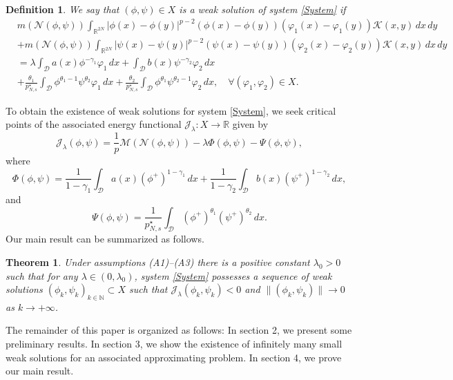 \documentclass[10pt,a4paper]{amsart}
\numberwithin{equation}{section}
\newtheorem{theorem}[theo]{Theorem}
\newtheorem{definition}[theo]{Definition}
\begin{document}
\begin{definition}\rm
We say that $(\phi,\psi)\in X$ is a weak solution of system \eqref{System} if
\begin{equation} \label{p11weak}
\begin{aligned}
&m(\mathcal{N}(\phi,\psi))\int_{\mathbb{R}^{2N}}|\phi(x)
 -\phi(y)|^{p-2}(\phi(x)-\phi(y))(\varphi_1(x)
 -\varphi_1(y))\mathcal{K}(x,y)\,dx\,dy \\
&+m(\mathcal{N}(\phi,\psi))\int_{\mathbb{R}^{2N}}|\psi(x)
-\psi(y)|^{p-2}(\psi(x)-\psi(y))(\varphi_2(x)-\varphi_2(y))\mathcal{K}(x,y)\,dx\,dy \\
&=\lambda \int_\mathcal{D} a(x)\phi^{-\gamma_1}\varphi_1\,dx+ \int_\mathcal{D}b(x)
 \psi^{-\gamma_2}\varphi_2\,dx \\
&+\frac{\theta_1}{p^\star_{N,s}}\int_\mathcal{D}\phi^{\theta_1-1}
\psi^{\theta_2}\varphi_1\,dx
+\frac{\theta_2}{p^\star_{N,s}}\int_\mathcal{D}\phi^{\theta_1}\psi^{\theta_2-1}
\varphi_2\,dx,\quad \forall (\varphi_1,\varphi_2)\in X.
\end{aligned}
\end{equation}
\end{definition}

To obtain the existence of  weak solutions for system \eqref{System}, 
we seek critical points of the associated energy functional 
$\mathcal{J}_\lambda:X\to\mathbb{R}$ given by
$$
\mathcal{J}_\lambda(\phi,\psi)=\frac{1}{p}\mathscr{M}(\mathcal{N}(\phi,\psi))
-\lambda \Phi(\phi,\psi)-\Psi(\phi,\psi), 
$$
where
$$
\Phi(\phi,\psi)=\frac{1}{1-\gamma_1}\int_\mathcal{D} a(x)(\phi^+)^{1-\gamma_1}\,dx
+\frac{1}{1-\gamma_2}\int_\mathcal{D}b(x)(\psi^+)^{1-\gamma_2}\,dx, 
$$
and
$$
\Psi(\phi,\psi)=\frac{1}{p^\star_{N,s}}\int_\mathcal{D}  
(\phi^+)^{\theta_1}(\psi^+)^{\theta_2}\,dx.
$$
Our main result can be summarized as follows.


\setcounter{theo}{1}
\begin{theorem}\label{Theorem} 
Under  assumptions {\rm (A1)--(A3)} there is a positive constant $\lambda_0>0$ such 
that for any $\lambda\in (0,\lambda_0)$, system \eqref{System} possesses a sequence
 of weak solutions $(\phi_k,\psi_k)_{k\in\mathbb{N}}\subset X$ such that
 $\mathcal{J}_\lambda(\phi_k,\psi_k)< 0$ and $\|(\phi_k,\psi_k)\|\to 0$
 as $k\to +\infty$.
\end{theorem}


The remainder of this paper is organized as follows:
 In section 2, we present some preliminary results. 
 In section 3, we show the existence of infinitely many small weak solutions for 
 an associated approximating problem. 
 In section 4, we prove our main result.
 
\end{document}
